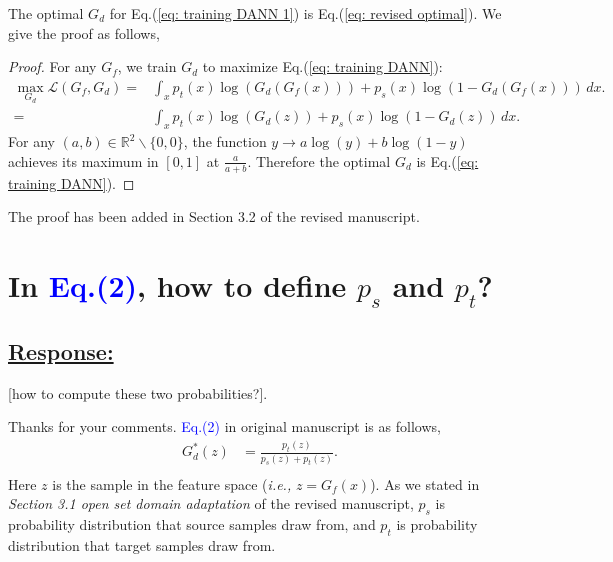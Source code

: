 The optimal $G_d$ for Eq.(\ref{eq: training DANN 1}) is Eq.(\ref{eq: revised optimal}).
We give the proof as follows,
\begin{proof}
    For any $G_f$, we train $G_d$ to maximize Eq.(\ref{eq: training DANN}):
    \begin{equation}
        \label{eq: proof optimal discriminator}
        \begin{split}
            \max_{G_d} \mathscr{L}(G_f,G_d)  = &\int_x p_t(x)\log \left(G_d\left(G_f\left(x\right)\right)\right)
              + p_s(x) \log\left(1-G_d\left(G_f\left(x\right)\right)\right) \, dx.
            \\ = &\int_x p_t(x)\log \left(G_d\left(z\right)\right)
              + p_s(x) \log\left(1-G_d\left(z\right)\right) \, dx.
        \end{split}
    \end{equation}
    For any $(a,b) \in \mathbb{R}^2 \backslash \{0,0\}$, the function $y \to a\log(y) + b\log(1-y)$ achieves its maximum in $[0,1]$ at $\frac{a}{a+b}$.
    Therefore the optimal $G_d$ is Eq.(\ref{eq: training DANN}).
\end{proof}

The proof has been added in Section 3.2 of the revised manuscript.

\section{In \textcolor{blue}{Eq.(2)}, how to define $p_s$ and $p_t$?}
\subsection*{\underline{\textbf{Response:}}}

\textcolor[rgb]{1.00,0.00,0.00}{[how to compute these two probabilities?]}.

Thanks for your comments.
\textcolor{blue}{Eq.(2)} in original manuscript is as follows,
\begin{equation}
    \label{eq: revised optimal}
    \begin{split}
        G_d^*(z) &= \frac{p_t(z)}{p_s(z)+p_t(z)}. \\
    \end{split}
\end{equation}
Here $z$ is the sample in the feature space (\textit{i.e.,} $z=G_f(x)$).
As we stated in \textit{Section 3.1 open set domain adaptation} of the revised manuscript, $p_s$ is probability distribution that source samples draw from, and $p_t$ is probability distribution that target samples draw from. 



